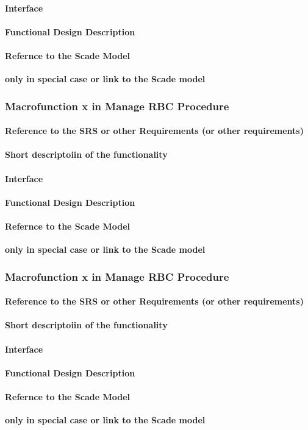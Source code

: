 \paragraph{Interface}
\paragraph{Functional Design Description}
\paragraph{Refernce to the Scade Model}
\textbf{only in special case or link to the Scade model}

\subsubsection{Macrofunction x in Manage RBC Procedure}%
\paragraph{Reference to the SRS or other Requirements (or other requirements)}
\paragraph{Short descriptoiin of the functionality}
\paragraph{Interface}
\paragraph{Functional Design Description}
\paragraph{Refernce to the Scade Model}
\textbf{only in special case or link to the Scade model}

\subsubsection{Macrofunction x in Manage RBC Procedure}%
\paragraph{Reference to the SRS or other Requirements (or other requirements)}
\paragraph{Short descriptoiin of the functionality}
\paragraph{Interface}
\paragraph{Functional Design Description}
\paragraph{Refernce to the Scade Model}
\textbf{only in special case or link to the Scade model}

